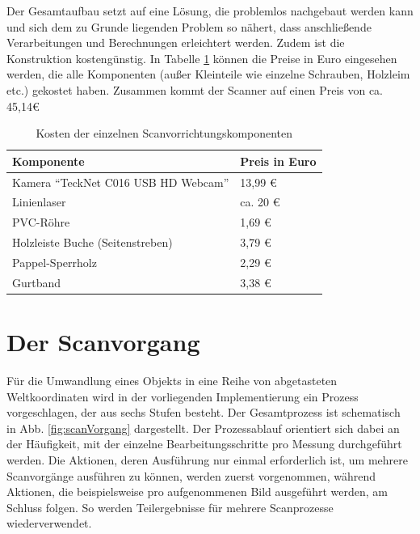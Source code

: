Der Gesamtaufbau setzt auf eine Lösung, die problemlos nachgebaut werden kann und sich dem zu Grunde liegenden Problem so nähert, dass anschließende Verarbeitungen und Berechnungen erleichtert werden. Zudem ist die Konstruktion kostengünstig. In Tabelle \ref{tab:preise} können die Preise in Euro eingesehen werden, die alle Komponenten (außer Kleinteile wie einzelne Schrauben, Holzleim etc.) gekostet haben. Zusammen kommt der Scanner auf einen Preis von ca. 45,14\euro

\begin{table} %
	\centering
		\begin{tabular}{l | l}
		\textbf{Komponente} & \textbf{Preis in Euro}\\
		\hline
			Kamera "`TeckNet C016 USB HD Webcam"' & 13,99 \euro\\
			Linienlaser &  ca. 20 \euro\\
			PVC-Röhre & 1,69 \euro\\
			Holzleiste Buche (Seitenstreben) & 3,79 \euro\\
			Pappel-Sperrholz &  2,29 \euro\\
			Gurtband & 3,38 \euro
		\end{tabular}
	\caption{Kosten der einzelnen Scanvorrichtungskomponenten}
	\label{tab:preise}
\end{table}


\section{Der Scanvorgang}
\label{sec:scanvorgang}
Für die Umwandlung eines Objekts in eine Reihe von abgetasteten Weltkoordinaten wird in der vorliegenden Implementierung ein Prozess vorgeschlagen, der aus sechs Stufen besteht. Der Gesamtprozess ist schematisch in Abb. \ref{fig:scanVorgang} dargestellt. Der Prozessablauf orientiert sich dabei an der Häufigkeit, mit der einzelne Bearbeitungsschritte pro Messung durchgeführt werden. Die Aktionen, deren Ausführung nur einmal erforderlich ist, um mehrere Scanvorgänge ausführen zu können, werden zuerst vorgenommen, während Aktionen, die beispielsweise pro aufgenommenen Bild ausgeführt werden, am Schluss folgen. So werden Teilergebnisse für mehrere Scanprozesse wiederverwendet.
\bigbreak

